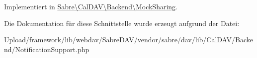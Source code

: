 Implementiert in \mbox{\hyperlink{class_sabre_1_1_cal_d_a_v_1_1_backend_1_1_mock_sharing_a5ac03b4237d34ab9fcd5e5dc7414b83e}{Sabre\textbackslash{}\+Cal\+D\+A\+V\textbackslash{}\+Backend\textbackslash{}\+Mock\+Sharing}}.



Die Dokumentation für diese Schnittstelle wurde erzeugt aufgrund der Datei\+:\begin{DoxyCompactItemize}
\item 
Upload/framework/lib/webdav/\+Sabre\+D\+A\+V/vendor/sabre/dav/lib/\+Cal\+D\+A\+V/\+Backend/Notification\+Support.\+php\end{DoxyCompactItemize}
